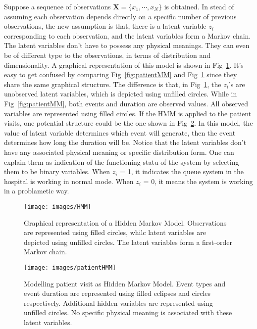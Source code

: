 Suppose a sequence of observations \(\mathbf{X} = \{x_1, \cdots, x_N\}\) is obtained. In stead of assuming each observation depends directly on a specific number of previous observations, the new assumption is that, there is a latent variable \(z_i\) corresponding to each observation, and the latent variables form a Markov chain. The latent variables don't have to possess any physical meanings. They can even be of different type to the observations, in terms of distribution and dimensionality. A graphical representation of this model is shown in Fig~\ref{fig:HMM}. It's easy to get confused by comparing Fig~\ref{fig:patientMM} and Fig~\ref{fig:HMM} since they share the same graphical structure. The difference is that, in Fig~\ref{fig:HMM}, the \(z_i\)'s are unobserved latent variables, which is depicted using unfilled circles. While in Fig~\ref{fig:patientMM}, both events and duration are observed values. All observed variables are represented using filled circles. If the HMM is applied to the patient visits, one potential structure could be the one shown in Fig~\ref{fig:patientHMM}. In this model, the value of latent variable determines which event will generate, then the event determines how long the duration will be. Notice that the latent variables don't have any associated physical meaning or specific distribution form. One can explain them as indication of the functioning statu of the system by selecting them to be binary variables. When \(z_i\) = 1, it indicates the queue system in the hospital is working in normal mode. When \(z_i\) = 0, it means the system is working in a problametic way.

\begin{figure}[!ht]
	\begin{center}
		\texttt{[image: images/HMM]}
		\caption{Graphical representation of a Hidden Markov Model. Observations are represented using filled circles, whilc latent variables are depicted using unfilled circles. The latent variables form a first-order Markov chain.}
		\label{fig:HMM}
	\end{center}
\end{figure}

\begin{figure}[!ht]
	\begin{center}
		\texttt{[image: images/patientHMM]}
		\caption{Modelling patient visit as Hidden Markov Model. Event types and event duration are represented using filled eclipses and circles respectively. Additional hidden variables are represented using unfilled circles. No specific physical meaning is associated with these latent variables.}
		\label{fig:patientHMM}
	\end{center}
\end{figure}

